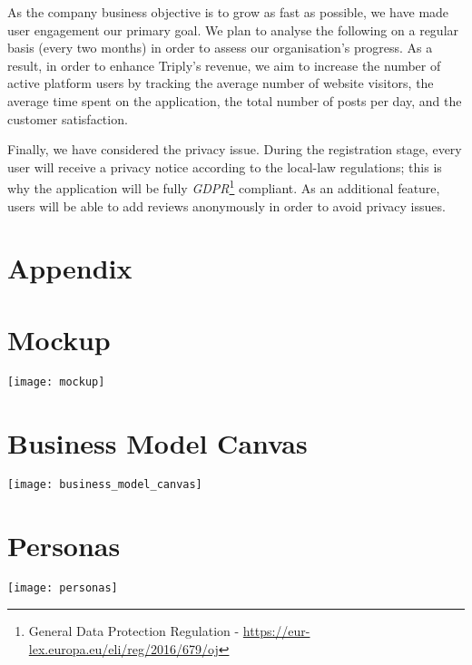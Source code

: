 \documentclass[letterpaper, 11pt]{Proposal}
\begin{document}
As the company business objective is to grow as fast as possible, we have made user engagement our primary goal.
We plan to analyse the following  on a regular basis (every two months) in order to assess our organisation's progress.
As a result, in order to enhance Triply's revenue, we aim to increase the number of active platform users by tracking the average number of website visitors, the average time spent on the application, the total number of posts per day, and the customer satisfaction. 

Finally, we have considered the privacy issue. During the registration stage, every user will receive a privacy notice according to the local-law regulations; this is why the application will be fully \emph{GDPR}\footnote{General Data Protection Regulation - \url{https://eur-lex.europa.eu/eli/reg/2016/679/oj}} compliant. As an additional feature, users will be able to add reviews anonymously in order to avoid privacy issues. 




\clearpage

\section*{Appendix}\label{sec:appendix}

\appendix

\renewcommand*{\thepage}{A\arabic{page}}

\section{Mockup}

\texttt{[image: mockup]}\label{sec:appendix_mockup}

\section{Business Model Canvas}

\texttt{[image: business\_model\_canvas]}\label{sec:business_model_canvas}

\section{Personas}\label{sec:appendix_personas}

\texttt{[image: personas]}
\end{document}
